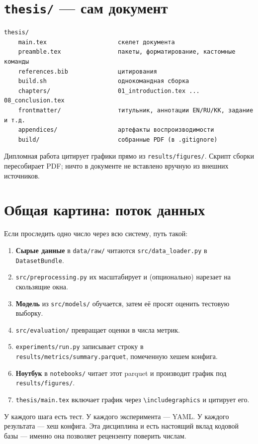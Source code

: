 \documentclass[11pt,a4paper]{article}
\newcommand{\code}[1]{\texttt{#1}}
\begin{document}
\section{\texttt{thesis/} --- сам документ}

\begin{Verbatim}
thesis/
    main.tex                    скелет документа
    preamble.tex                пакеты, форматирование, кастомные команды
    references.bib              цитирования
    build.sh                    однокомандная сборка
    chapters/                   01_introduction.tex ... 08_conclusion.tex
    frontmatter/                титульник, аннотации EN/RU/KK, задание и т.д.
    appendices/                 артефакты воспроизводимости
    build/                      собранные PDF (в .gitignore)
\end{Verbatim}

Дипломная работа цитирует графики прямо из \code{results/figures/}. Скрипт сборки пересобирает PDF; ничто в документе не вставлено вручную из внешних источников.

\section{Общая картина: поток данных}

Если проследить одно число через всю систему, путь такой:

\begin{enumerate}
  \item \textbf{Сырые данные} в \code{data/raw/} читаются \code{src/data\_loader.py} в \code{DatasetBundle}.
  \item \code{src/preprocessing.py} их масштабирует и (опционально) нарезает на скользящие окна.
  \item \textbf{Модель} из \code{src/models/} обучается, затем её просят оценить тестовую выборку.
  \item \code{src/evaluation/} превращает оценки в числа метрик.
  \item \code{experiments/run.py} записывает строку в \code{results/metrics/summary.parquet}, помеченную хешем конфига.
  \item \textbf{Ноутбук} в \code{notebooks/} читает этот parquet и производит график под \code{results/figures/}.
  \item \code{thesis/main.tex} включает график через \code{\textbackslash includegraphics} и цитирует его.
\end{enumerate}

У каждого шага есть тест. У каждого эксперимента --- YAML. У каждого результата --- хеш конфига. Эта дисциплина и есть настоящий вклад кодовой базы --- именно она позволяет рецензенту поверить числам.
\end{document}
